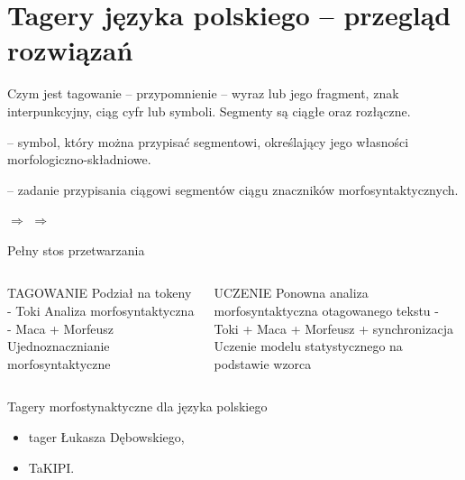 \documentclass{beamer}
\begin{document}
\section{Tagery języka polskiego -- przegląd rozwiązań}
\frame{\sectionpage}

\begin{frame}{Czym jest tagowanie -- przypomnienie}
   -- wyraz lub jego fragment, znak interpunkcyjny, ciąg cyfr
lub symboli. Segmenty są ciągłe oraz rozłączne.
  \vspace{0.5cm}

   -- symbol, który można przypisać segmentowi, określający jego własności morfologiczno-składniowe.
  \vspace{0.5cm}

   -- zadanie przypisania ciągowi segmentów ciągu znaczników morfosyntaktycznych.
  \vspace{1cm}

   $\Rightarrow$  $\Rightarrow$ 
\end{frame}

\begin{frame}{Pełny stos przetwarzania}
  \begin{columns}[c]
    \begin{center}
  TAGOWANIE
  Podział na tokeny - Toki
  Analiza morfosyntaktyczna - Maca + Morfeusz
  Ujednoznacznianie morfosyntaktyczne
\end{center}
\begin{center}
  UCZENIE
  Ponowna analiza morfosyntaktyczna otagowanego tekstu - Toki + Maca + Morfeusz + synchronizacja
  Uczenie modelu statystycznego na podstawie wzorca
\end{center}
\end{columns}
\end{frame}

\begin{frame}{Tagery morfostynaktyczne dla języka polskiego}
\begin{itemize}
\item tager Łukasza Dębowskiego,
\item TaKIPI.
\end{itemize}
\end{frame}
\end{document}
